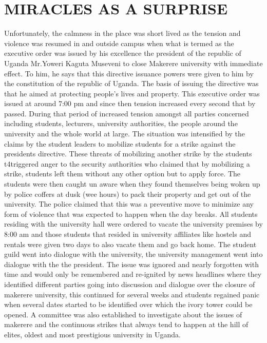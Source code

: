 \documentclass[12pt]{article}
\begin{document}
	\section{MIRACLES AS A SURPRISE}
	Unfortunately, the calmness in the place was short lived as the tension
	and violence was resumed in and outside campus when what is termed
	as the executive order was issued by his excellence the president of the
	republic of Uganda Mr.Yoweri Kaguta Museveni to close Makerere
	university with immediate effect.
	To him, he says that this directive issuance powers were given to him
	by the constitution of the republic of Uganda. The basis of issuing the
	directive was that he aimed at protecting people's lives and property.
	This executive order was issued at around 7:00 pm and since then
	tension increased every second that by passed.
	During that period of increased tension amongst all parties concerned including students, lecturers, university authorities, the people around the university and the whole world at large. The situation was intensified by the claims by the student leaders to mobilize students for a strike against the presidents directive.
	These threats of mobilizing another strike by the students t4triggered
	anger to the security authorities who claimed that by mobilizing a
	strike, students left them without any other option but to apply force.
	The students were then caught un aware when they found themselves
	being woken up by police coffers at dusk (wee hours) to pack their
	property and get out of the university.
	The police claimed that this was a preventive move to minimize any
	form of violence that was expected to happen when the day breaks.
	All students residing with the university hall were ordered to vacate
	the university premises by 8:00 am and those students that resided
	in university affiliates like hostels and rentals were given two days to
	also vacate them and go back home.
	The student guild went into dialogue with the university, the university management went into dialogue with the the president.
	The issue was ignored and nearly forgotten with time and would
	only be remembered and re-ignited by news headlines where they
	identified different parties going into discussion and dialogue over the
	closure of makerere university, this continued for several weeks and
	students regained panic when several dates started to be identified
	over which the ivory tower could be opened.
	A committee was also established to investigate about the issues of
	makerere and the continuous strikes that always tend to happen at
	the hill of elites, oldest and most prestigious university in Uganda.
	
\end{document}
